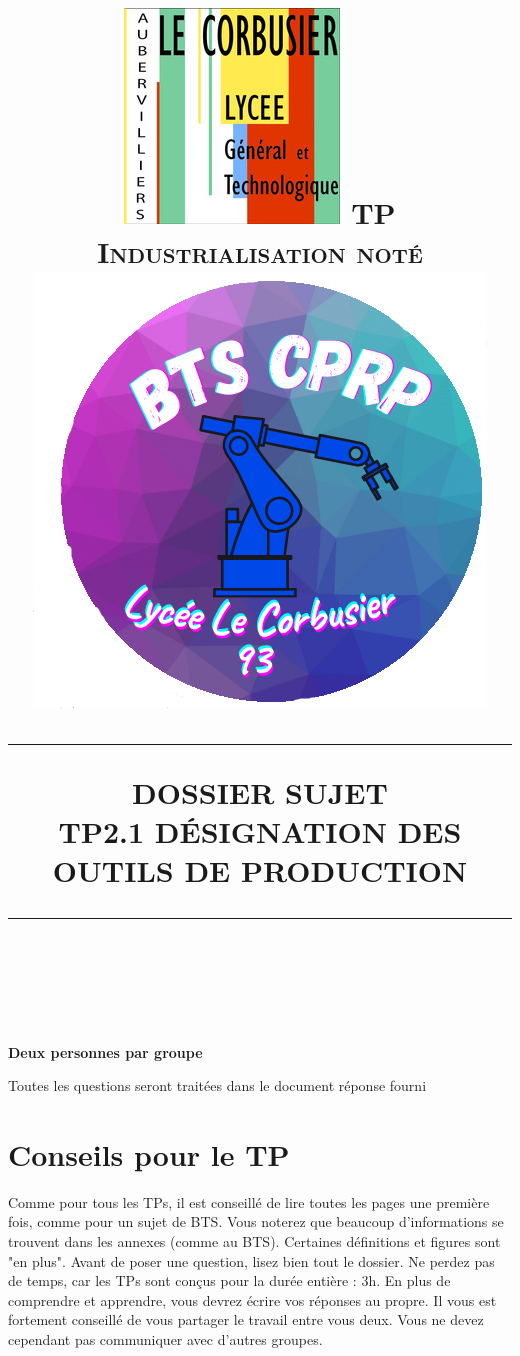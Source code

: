 \documentclass[12pt]{article}
\newcommand{\HRule}[1]{\rule{\linewidth}{#1}}
\begin{document}
 
\title{ \includegraphics[width=0.18\linewidth]{Images/corbu.jpg} \hspace{2cm} \normalsize \textsc{TP Industrialisation noté \hspace{2cm} \includegraphics[width=0.2\linewidth]{Images/logo.png}}
		\\ [2.0cm]
		\HRule{0.5pt} DOSSIER SUJET \\
		\LARGE \textbf{\uppercase{TP2.1 Désignation des outils de production}}
		\HRule{2pt} \\ [0.5cm]}
\maketitle

\textbf{Deux personnes par groupe}\\
\begin{center}
Toutes les questions seront traitées dans le document réponse fourni
\end{center}










\sectionfont{\scshape}




\newpage




\tableofcontents
\newpage



\section{Conseils pour le TP}
  \bcinfo Comme pour tous les TPs, il est conseillé de lire toutes les pages une première fois, comme pour un sujet de BTS. Vous noterez que beaucoup d'informations se trouvent dans les annexes (comme au BTS). Certaines définitions et figures sont "en plus". Avant de poser une question, lisez bien tout le dossier. Ne perdez pas de temps, car les TPs sont conçus pour la durée entière : 3h. En plus de comprendre et apprendre, vous devrez écrire vos réponses au propre. Il vous est fortement conseillé de vous partager le travail entre vous deux. Vous ne devez cependant pas communiquer avec d'autres groupes.
\end{document}
